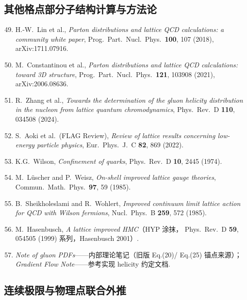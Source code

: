 \documentclass[11pt,a4paper]{ctexart}
\begin{document}
\subsection*{其他格点部分子结构计算与方法论}
\begin{enumerate}\setcounter{enumi}{48}
  \item H.-W.~Lin et al., \textit{Parton distributions and lattice QCD
  calculations: a community white paper}, Prog.\ Part.\ Nucl.\ Phys.\
  \textbf{100}, 107 (2018), arXiv:1711.07916.
  \item M.~Constantinou et al., \textit{Parton distributions and
  lattice QCD calculations: toward 3D structure}, Prog.\ Part.\
  Nucl.\ Phys.\ \textbf{121}, 103908 (2021), arXiv:2006.08636.
  \item R.~Zhang et al., \textit{Towards the determination of the gluon
  helicity distribution in the nucleon from lattice quantum
  chromodynamics}, Phys.\ Rev.\ D \textbf{110}, 034508 (2024).
  \item S.~Aoki et al.\ (FLAG Review), \textit{Review of lattice results
  concerning low-energy particle physics}, Eur.\ Phys.\ J.\ C
  \textbf{82}, 869 (2022).
  \item K.G.~Wilson, \textit{Confinement of quarks}, Phys.\ Rev.\ D
  \textbf{10}, 2445 (1974).
  \item M.~L\"uscher and P.~Weisz, \textit{On-shell improved lattice
  gauge theories}, Commun.\ Math.\ Phys.\ \textbf{97}, 59 (1985).
  \item B.~Sheikholeslami and R.~Wohlert, \textit{Improved continuum
  limit lattice action for QCD with Wilson fermions}, Nucl.\ Phys.\ B
  \textbf{259}, 572 (1985).
  \item M.~Hasenbusch, \textit{A lattice improved HMC}（HYP 涂抹，
  Phys.\ Rev.\ D \textbf{59}, 054505 (1999) 系列，Hasenbusch 2001）.
  \item \textit{Note of gluon PDFs}——内部理论笔记（旧版 Eq.(20)/
  Eq.(25) 锚点来源）；\textit{Gradient Flow Note}——参考实现 helicity
  约定文档.
\end{enumerate}

\subsection{连续极限与物理点联合外推}
\label{sec:extrapolate}
\end{document}
